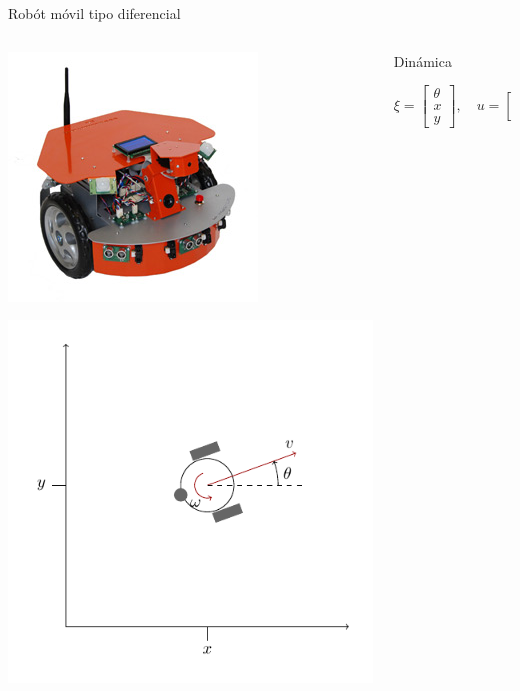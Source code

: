 \documentclass[presentation,aspectratio=169]{beamer}
\begin{document}
\begin{frame}[label={sec:orgef1dcd9}]{Robót móvil tipo diferencial}
\begin{columns}
\begin{column}{0.4\columnwidth}
\begin{center}
 \includegraphics[width=.3\linewidth]{../figures/X80Pro.jpg}
\end{center}
\begin{center}
 \includegraphics[width=1.0\linewidth]{../figures/unicycle-model}
\end{center}
\end{column}

\begin{column}{0.6\columnwidth}
\pause

\alert{Dinámica}

\[ \xi = \begin{bmatrix} \theta\\x\\y \end{bmatrix},   \quad u = \begin{bmatrix} \omega\\v \end{bmatrix}\]




\end{column}
\end{columns}
\end{frame}
\end{document}
